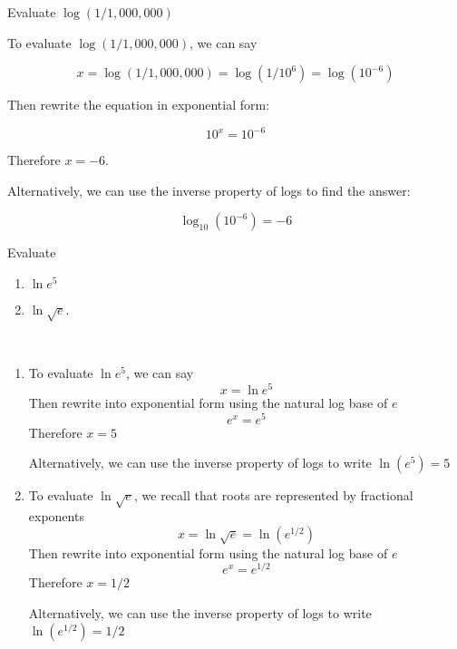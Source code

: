 \begin{example}
    Evaluate $\log(1/1,000,000)$
\end{example}
\begin{solution}
    To evaluate $\log(1/1,000,000)$, we can say

    \[ x = \log(1/1,000,000) = \log(1/10^6) = \log(10^{-6}) \]

    Then rewrite the equation in exponential form:

    \[ 10^x = 10^{-6} \]

    Therefore $x = -6$.

    Alternatively, we can use the inverse property of logs to find the answer:

    \[ \log_{10}(10^{-6}) = -6 \]
\end{solution}

\begin{example}
    Evaluate
    \begin{enumerate}
        \item $\ln e^5$
        \item $\ln \sqrt{e}$.
    \end{enumerate}
\end{example}
\begin{solution}~

    \begin{enumerate}

        \item To evaluate $\ln e^5$, we can say
              \[ x = \ln e^5 \]
              Then rewrite into exponential form using the natural log base of $e$
              \[ e^x = e^5 \]
              Therefore $x = 5$

              Alternatively, we can use the inverse property of logs to write $\ln(e^5) = 5$

        \item To evaluate $\ln \sqrt{e}$, we recall that roots are represented by fractional exponents
              \[ x = \ln \sqrt{e} = \ln (e^{1/2}) \]
              Then rewrite into exponential form using the natural log base of $e$
              \[ e^x = e^{1/2} \]
              Therefore $x = 1/2$

              Alternatively, we can use the inverse property of logs to write $\ln(e^{1/2}) = 1/2$
    \end{enumerate}
\end{solution}

